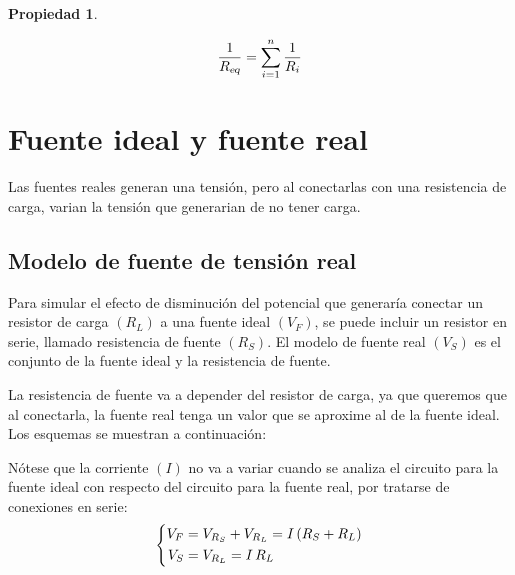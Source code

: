\documentclass[a5paper,12pt,twoside]{book}
\newtheorem{prop}{{Propiedad}}[chapter]
\begin{document}
\begin{mdframed}[style=MyFrame1]
    \begin{prop}
    \end{prop}
    \begin{equation*}
        \frac{1}{{{R}_\textsl{{eq}}}} = \sum_{i=1}^n \frac{1}{R_i}
    \end{equation*}
\end{mdframed}


\section{Fuente ideal y fuente real}

Las fuentes reales generan una tensión, pero al conectarlas con una resistencia de carga, varian la tensión que generarian de no tener carga.


\subsection{Modelo de fuente de tensión real}

Para simular el efecto de disminución del potencial que generaría conectar un resistor de carga $(R_L)$ a una fuente ideal $(V_F)$, se puede incluir un resistor en serie, llamado resistencia de fuente $(R_S)$.
El modelo de fuente real $(V_S)$ es el conjunto de la fuente ideal y la resistencia de fuente.

La resistencia de fuente va a depender del resistor de carga, ya que queremos que al conectarla, la fuente real tenga un valor que se aproxime al de la fuente ideal. Los esquemas se muestran a continuación:

\begin{multicols}{2}
    \begin{center}
        \def\svgwidth{0.9\linewidth}
        
    \end{center}
    \begin{center}
        \def\svgwidth{0.9\linewidth}
        
    \end{center}
\end{multicols}

Nótese que la corriente $(I)$ no va a variar cuando se analiza el circuito para la fuente ideal con respecto del circuito para la fuente real, por tratarse de conexiones en serie:
\begin{equation*}
    \left\{
    \begin{aligned}
        V_F &= V_{R_S} + V_{R_L} = I \left(R_S + R_L\right)
        \\
        V_S &= V_{R_L} = I \, R_L
    \end{aligned}
    \right.
\end{equation*}
\end{document}
